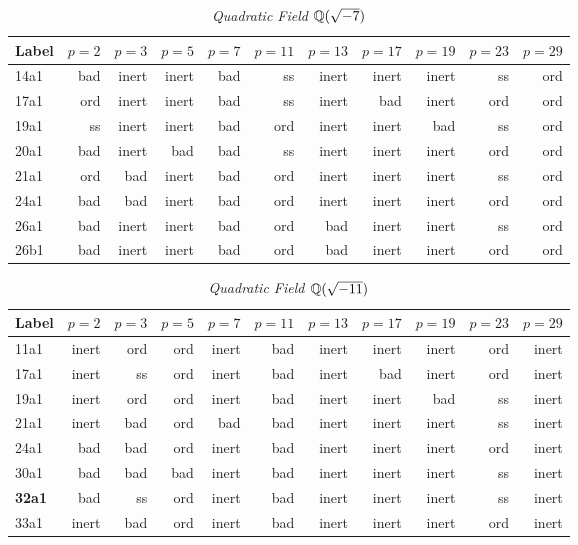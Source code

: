 \documentclass[a4paper,11pt]{article}
\numberwithin{equation}{section}
\begin{document}
\begin{table}[H]	\caption{\label{table:ordinary}\emph{Quadratic Field $\mathbb{Q}(\sqrt{-7})$}}
\begin{tabular}[t]{lrrrrrrrrrr}
	\toprule
Label   &  $p=2$ & $p=3$ & $p=5$ & $p=7$ & $p=11$ & $p=13$ & $p=17$ & $p=19$ & $p=23$ & $p=29$

\\ \midrule 14a1&bad &inert&inert&bad &ss&inert&inert&inert&ss&ord\\ \midrule 17a1&ord&inert&inert&bad &ss&inert&bad &inert&ord&ord\\ \midrule 19a1&ss&inert&inert&bad &ord&inert&inert&bad &ss&ord\\ \midrule 20a1&bad &inert&bad &bad &ss&inert&inert&inert&ord&ord\\ \midrule 21a1&ord&bad &inert&bad &ord&inert&inert&inert&ss&ord\\ \midrule 24a1&bad &bad &inert&bad &ord&inert&inert&inert&ord&ord\\ \midrule 26a1&bad &inert&inert&bad &ord&bad &inert&inert&ss&ord\\ \midrule 26b1&bad &inert&inert&bad &ord&bad &inert&inert&ord&ord

\\
\bottomrule
\end{tabular}
\end{table}


\begin{table}[H]	\caption{\label{table:ordinary}\emph{Quadratic Field $\mathbb{Q}(\sqrt{-11})$}}
\begin{tabular}[t]{lrrrrrrrrrr}
	\toprule
Label   &  $p=2$ & $p=3$ & $p=5$ & $p=7$ & $p=11$ & $p=13$ & $p=17$ & $p=19$ & $p=23$ & $p=29$

\\ \midrule 11a1&inert&ord&ord&inert&bad &inert&inert&inert&ord&inert\\ \midrule 17a1&inert&ss&ord&inert&bad &inert&bad &inert&ord&inert\\ \midrule 19a1&inert&ord&ord&inert&bad &inert&inert&bad &ss&inert\\ \midrule 21a1&inert&bad &ord&bad &bad &inert&inert&inert&ss&inert\\ \midrule 24a1&bad &bad &ord&inert&bad &inert&inert&inert&ord&inert\\ \midrule 30a1&bad &bad &bad &inert&bad &inert&inert&inert&ss&inert\\ \midrule \textbf{32a1}&bad &ss&ord&inert&bad &inert&inert&inert&ss&inert\\ \midrule 33a1&inert&bad &ord&inert&bad &inert&inert&inert&ord&inert

\\
\bottomrule
\end{tabular}
\end{table}
\end{document}
